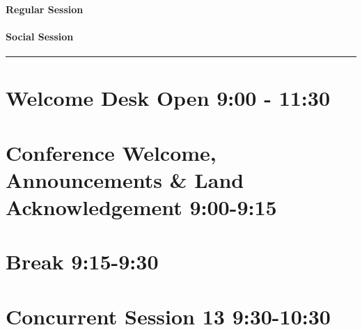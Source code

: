 \documentclass[
]{book}
\begin{document}
\begin{session}
\hypertarget{regular-session}{%
\paragraph{Regular Session}\label{regular-session}}
\end{session}

\begin{social}
\hypertarget{social-session}{%
\paragraph{Social Session}\label{social-session}}
\end{social}

\begin{center}\rule{0.5\linewidth}{0.5pt}\end{center}

\hypertarget{welcome-desk-open-900---1130-2}{%
\section*{Welcome Desk Open \textbar{} 9:00 - 11:30}\label{welcome-desk-open-900---1130-2}}

\hypertarget{conference-welcome-announcements-land-acknowledgement-900-915-2}{%
\section*{Conference Welcome, Announcements \& Land Acknowledgement \textbar{} 9:00-9:15}\label{conference-welcome-announcements-land-acknowledgement-900-915-2}}

\hypertarget{break-915-930-2}{%
\section*{Break \textbar{} 9:15-9:30}\label{break-915-930-2}}

\hypertarget{concurrent-session-13-930-1030}{%
\section*{Concurrent Session 13 \textbar{} 9:30-10:30}\label{concurrent-session-13-930-1030}}
\end{document}
